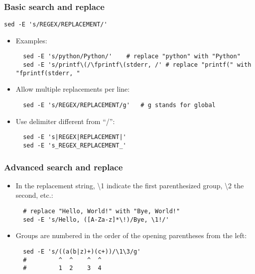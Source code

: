\documentclass[12pt]{article}
\begin{document}
\subsubsection{Basic search and replace}

\begin{verbatim}
sed -E 's/REGEX/REPLACEMENT/'
\end{verbatim}

\begin{itemize}
  \item Examples:
  \begin{verbatim}
  sed -E 's/python/Python/'    # replace "python" with "Python"
  sed -E 's/printf\(/\fprintf\(stderr, /' # replace "printf(" with "fprintf(stderr, "
  \end{verbatim}
  
  \item Allow multiple replacements per line:
  \begin{verbatim}
  sed -E 's/REGEX/REPLACEMENT/g'   # g stands for global
  \end{verbatim}
  
  \item Use delimiter different from ``/'':
  \begin{verbatim}
  sed -E 's|REGEX|REPLACEMENT|'
  sed -E 's_REGEX_REPLACEMENT_'
  \end{verbatim}
\end{itemize}

\subsubsection{Advanced search and replace}

\begin{itemize}
  \item In the replacement string, \textbackslash1 indicate the first parenthesized group, \textbackslash2 the second, etc.:
  \begin{verbatim}
  # replace "Hello, World!" with "Bye, World!"
  sed -E 's/Hello, ([A-Za-z]*\!)/Bye, \1!/'
  \end{verbatim}
  
  \item Groups are numbered in the order of the opening parentheses from the left:
  \begin{verbatim}
  sed -E 's/((a(b|z)+)(c+))/\1\3/g'
  #         ^  ^    ^  ^
  #         1  2    3  4
  \end{verbatim}
\end{itemize}
\end{document}
